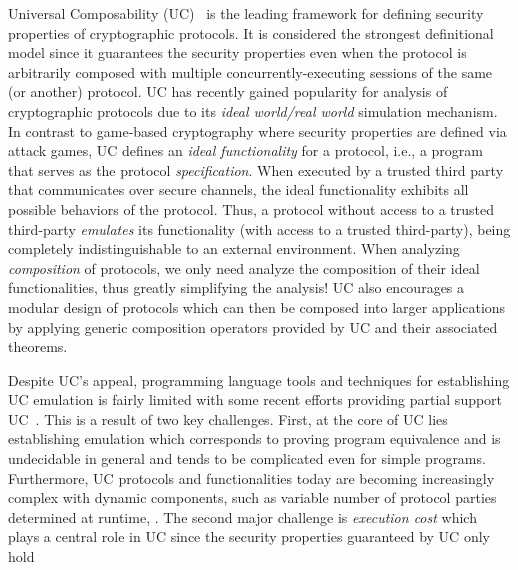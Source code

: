 Universal Composability (UC)~\cite{canettiUC} is the leading framework for defining security properties of cryptographic protocols.
It is considered the strongest definitional model since it guarantees the security properties even when the protocol is arbitrarily composed with
multiple concurrently-executing sessions of the same (or another) protocol.
UC has recently gained popularity for analysis of cryptographic protocols due to its \emph{ideal world/real world} simulation mechanism.
In contrast to game-based cryptography where security properties are defined via attack games,
UC defines an \emph{ideal functionality} for a protocol, i.e., a program that serves as the protocol \emph{specification}.
When executed by a trusted third party that communicates over secure channels, the ideal functionality exhibits all possible behaviors of the protocol.
Thus, a protocol without access to a trusted third-party \emph{emulates} its functionality (with access to a trusted third-party),
being completely indistinguishable to an external environment.
When analyzing \emph{composition} of protocols, we only need analyze the composition of their ideal functionalities, thus greatly
simplifying the analysis!
UC also encourages a modular design of protocols which can then be composed into larger applications by applying generic composition operators
provided by UC and their associated theorems.

Despite UC's appeal, programming language tools and techniques for establishing UC emulation is fairly limited with some recent efforts providing
partial support UC~\cite{ilc,easyuc,ipdl,symbolicuc,barbosa}. This is a result of two key challenges.
First, at the core of UC lies establishing emulation which corresponds to proving program equivalence and is undecidable in general
and tends to be complicated even for simple programs.
Furthermore, UC protocols and functionalities today are becoming increasingly complex with dynamic components,
such as variable number of protocol parties determined at runtime, .
The second major challenge is \emph{execution cost} which plays a central role in UC since the security properties
guaranteed by UC only hold 


